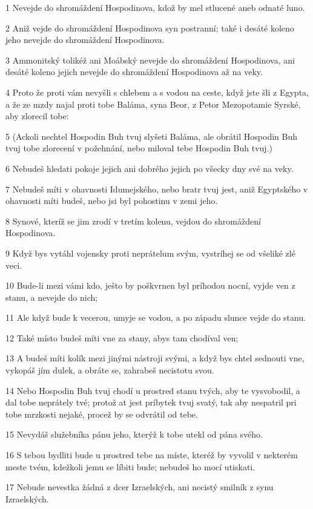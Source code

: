 \par 1 Nevejde do shromáždení Hospodinova, kdož by mel stlucené aneb odnaté luno.
\par 2 Aniž vejde do shromáždení Hospodinova syn postranní; také i desáté koleno jeho nevejde do shromáždení Hospodinova.
\par 3 Ammonitský tolikéž ani Moábský nevejde do shromáždení Hospodinova, ani desáté koleno jejich nevejde do shromáždení Hospodinova až na veky.
\par 4 Proto že proti vám nevyšli s chlebem a s vodou na ceste, když jste šli z Egypta, a že ze mzdy najal proti tobe Baláma, syna Beor, z Petor Mezopotamie Syrské, aby zlorecil tobe:
\par 5 (Ackoli nechtel Hospodin Buh tvuj slyšeti Baláma, ale obrátil Hospodin Buh tvuj tobe zlorecení v požehnání, nebo miloval tebe Hospodin Buh tvuj.)
\par 6 Nebudeš hledati pokoje jejich ani dobrého jejich po všecky dny své na veky.
\par 7 Nebudeš míti v ohavnosti Idumejského, nebo bratr tvuj jest, aniž Egyptského v ohavnosti míti budeš, nebo jsi byl pohostinu v zemi jeho.
\par 8 Synové, kteríž se jim zrodí v tretím kolenu, vejdou do shromáždení Hospodinova.
\par 9 Když bys vytáhl vojensky proti neprátelum svým, vystríhej se od všeliké zlé veci.
\par 10 Bude-li mezi vámi kdo, ješto by poškvrnen byl príhodou nocní, vyjde ven z stanu, a nevejde do nich;
\par 11 Ale když bude k vecerou, umyje se vodou, a po západu slunce vejde do stanu.
\par 12 Také místo budeš míti vne za stany, abys tam chodíval ven;
\par 13 A budeš míti kolík mezi jinými nástroji svými, a když bys chtel sednouti vne, vykopáš jím dulek, a obráte se, zahrabeš necistotu svou.
\par 14 Nebo Hospodin Buh tvuj chodí u prostred stanu tvých, aby te vysvobodil, a dal tobe neprátely tvé; protož at jest príbytek tvuj svatý, tak aby nespatril pri tobe mrzkosti nejaké, procež by se odvrátil od tebe.
\par 15 Nevydáš služebníka pánu jeho, kterýž k tobe utekl od pána svého.
\par 16 S tebou bydliti bude u prostred tebe na míste, kteréž by vyvolil v nekterém meste tvém, kdežkoli jemu se líbiti bude; nebudeš ho mocí utiskati.
\par 17 Nebude nevestka žádná z dcer Izraelských, ani necistý smilník z synu Izraelských.
